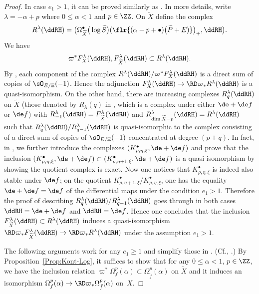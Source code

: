 \begin{proof}
In case $e_1 >1$, it can be proved similarly as \cite[Proposition~4.4]{Y}. In more details, write $\lambda = -\alpha+p$ where $0\leq\alpha <1$ and $p\in\ZZ$. On $\widetilde{X}$ define the complex
\begin{gather*} R^\lambda(\ddRH) = \big(\Omega_{\widetilde{X}}^\bullet\big(\log \widetilde{S}\big)(\flr{(\alpha -p+\bullet )\big(\widetilde{P}+E)}\big)_+, \ddRH \big). \end{gather*}
We have
\begin{gather*} \varpi^*F_X^\lambda(\ddRH), F_{\widetilde{X}}^\lambda(\ddRH) \subset R^\lambda(\ddRH). \end{gather*}
By \cite[Proposition~4.4(i)]{Y}, each component of the complex $R^\lambda(\ddRH)/\varpi^*F_X^\lambda(\ddRH)$ is a direct sum of copies of $\sO_{E/\Xi}(-1)$. Hence the adjunction $F_X^\lambda(\ddRH) \to \RD\varpi_*R^\lambda(\ddRH)$ is a quasi-isomorphism. On the other hand, there are increasing complexes $R^\lambda_q(\ddRH)$ on $\widetilde{X}$ (those denoted by $R_\lambda(q)$ in \cite[equation~(27)]{Y}, which is a complex under either $\de +\de f$ or $\de f$) with $R^\lambda_{-1}(\ddRH) = F^\lambda_{\widetilde{X}}(\ddRH)$ and $R^\lambda_{\dim \widetilde{X} -p}(\ddRH) = R^\lambda(\ddRH)$ such that $R^\lambda_q(\ddRH)/R^\lambda_{q-1}(\ddRH)$
is quasi-isomorphic to the complex consisting of a direct sum of copies of $\sO_{E/\Xi}(-1)$ concentrated at degree $(p+q)$. In fact, in \cite[Lemma~4.5]{Y}, we further introduce the complexes $(K_{\rho,\eta,\xi}^\bullet, \de +\de f)$ and prove that the inclusion $(K_{\rho,\eta,\xi}^\bullet, \de +\de f) \subset (K_{\rho,\eta+1,\xi}^\bullet, \de +\de f)$ is a quasi-isomorphism by showing the quotient complex is exact. Now
one notices that $K_{\rho,\eta,\xi}^\bullet$ is indeed also stable under $\de f$; on the quotient $K_{\rho,\eta+1,\xi}^\bullet/K_{\rho,\eta,\xi}^\bullet$, one has the equality $\de +\de f = \de f$ of the differential maps
under the condition $e_1>1$. Therefore the proof of \cite[Proposition~4.4(ii)]{Y} describing $R^\lambda_q(\ddRH)/R^\lambda_{q-1}(\ddRH)$ goes through in both cases $\ddRH = \de +\de f$ and $\ddRH = \de f$. Hence one concludes that the inclusion $F_{\widetilde{X}}^\lambda(\ddRH) \subset R^\lambda(\ddRH)$ induces a quasi-isomorphism $\RD\varpi_*F_{\widetilde{X}}^\lambda(\ddRH) \to \RD\varpi_*R^\lambda(\ddRH)$ under the assumption $e_1>1$.

The following arguments work for any $e_1\geq 1$ and simplify those in \cite[Section~4($b$)]{Y}. (Cf., \cite[Lemma 2.12(b)]{KKP}.) By Proposition~\ref{Prop:Kont-Log}, it suffices to show that for any $0\leq\alpha <1$, $p\in\ZZ$, we have the inclusion relation $\varpi^*\Omega_f^p(\alpha) \subset \Omega_{\tilde{f}}^p(\alpha)$ on $\widetilde{X}$ and it induces an isomorphism $\Omega_f^p(\alpha) \to \RD\varpi_*\Omega_{\tilde{f}}^p(\alpha)$ on~$X$.


\end{proof}
